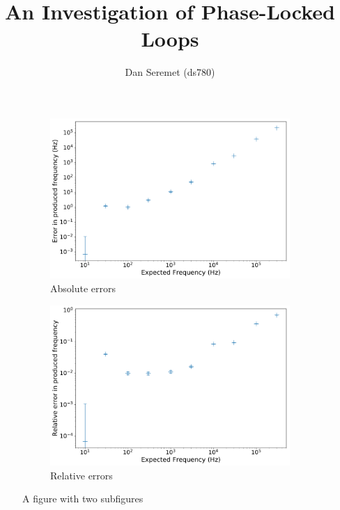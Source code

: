 \documentclass[11pt]{article}
\begin{document}
\title{An Investigation of Phase-Locked Loops}
\author{Dan Seremet (ds780)}
\maketitle

\begin{figure}
    \centering
    \begin{subfigure}{.5\textwidth}
        \centering
        \includegraphics[width=.9\textwidth]{../docs/arduino_clever}
        \caption{Absolute errors}\label{fig:sub1}
    \end{subfigure}%
    \begin{subfigure}{.5\textwidth}
        \centering
        \includegraphics[width=.9\textwidth]{../docs/arduino_clever_rel}
        \caption{Relative errors}\label{fig:sub2}
    \end{subfigure}
    \caption{A figure with two subfigures}\label{fig:test}
\end{figure}
    
\end{document}
